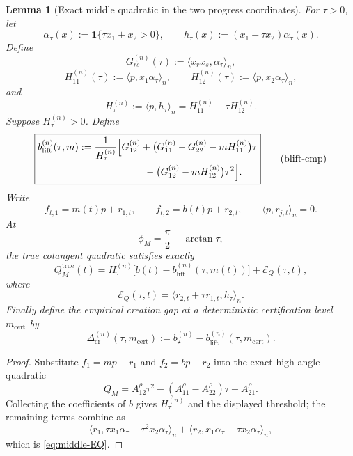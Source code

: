 \documentclass{article} %
\theoremstyle{plain}
\newtheorem{lemma}[theorem]{Lemma}
\theoremstyle{definition}
\theoremstyle{remark}
\begin{document}

\begin{lemma}[Exact middle quadratic in the two progress coordinates]
\label{lem:middle-two-progress}
For $\tau>0$, let
\[
\alpha_\tau(x):=\mathbf 1\{\tau x_1+x_2>0\},
\qquad
h_\tau(x):=(x_1-\tau x_2)\alpha_\tau(x).
\]
Define
\[
G_{rs}^{(n)}(\tau):=\langle x_rx_s,\alpha_\tau\rangle_n,
\]
\[
H_{11}^{(n)}(\tau):=\langle p,x_1\alpha_\tau\rangle_n,
\qquad
H_{12}^{(n)}(\tau):=\langle p,x_2\alpha_\tau\rangle_n,
\]
and
\[
\boxed{
H_\tau^{(n)}
:=
\langle p,h_\tau\rangle_n
=
H_{11}^{(n)}-\tau H_{12}^{(n)}.
}
\]
Suppose $H_\tau^{(n)}>0$.  Define
\[
\boxed{
\begin{aligned}
b_{\mathrm{lift}}^{(n)}(\tau,m)
:={}&
\frac{1}{H_\tau^{(n)}}
\Big[
G_{12}^{(n)}
+
\bigl(G_{11}^{(n)}-G_{22}^{(n)}-mH_{11}^{(n)}\bigr)\tau
\\
&\hspace{18mm}
-
\bigl(G_{12}^{(n)}-mH_{12}^{(n)}\bigr)\tau^2
\Big].
\end{aligned}
}
\tag{blift-emp}\label{eq:blift-emp}
\]
Write
\[
f_{t,1}=m(t)p+r_{1,t},
\qquad
f_{t,2}=b(t)p+r_{2,t},
\qquad
\langle p,r_{j,t}\rangle_n=0.
\]
At
\[
\phi_M=\frac\pi2-\arctan\tau,
\]
the true cotangent quadratic satisfies exactly
\[
\boxed{
Q_M^{\mathrm{true}}(t)
=
H_\tau^{(n)}
\bigl[b(t)-b_{\mathrm{lift}}^{(n)}(\tau,m(t))\bigr]
+
\mathcal E_Q(\tau,t),
}
\tag{middle-Q-decomp}\label{eq:middle-Q-decomp}
\]
where
\[
\boxed{
\mathcal E_Q(\tau,t)
=
\langle r_{2,t}+\tau r_{1,t},h_\tau\rangle_n.
}
\tag{middle-EQ}\label{eq:middle-EQ}
\]
Finally define the empirical creation gap at a deterministic certification
level $m_{\mathrm{cert}}$ by
\[
\boxed{
\Delta_{\mathrm{cr}}^{(n)}(\tau,m_{\mathrm{cert}})
:=
b_\star^{(n)}
-
b_{\mathrm{lift}}^{(n)}(\tau,m_{\mathrm{cert}}).
}
\tag{creation-gap}\label{eq:creation-gap}
\]
\end{lemma}

\begin{proof}
Substitute $f_1=mp+r_1$ and $f_2=bp+r_2$ into the exact high-angle
quadratic
\[
Q_M
=
A_{12}^\rho\tau^2
-(A_{11}^\rho-A_{22}^\rho)\tau
-A_{21}^\rho.
\]
Collecting the coefficients of $b$ gives $H_\tau^{(n)}$ and the displayed
threshold; the remaining terms combine as
\[
\langle r_1,\tau x_1\alpha_\tau-\tau^2x_2\alpha_\tau\rangle_n
+
\langle r_2,x_1\alpha_\tau-\tau x_2\alpha_\tau\rangle_n,
\]
which is \eqref{eq:middle-EQ}.
\end{proof}
\end{document}
